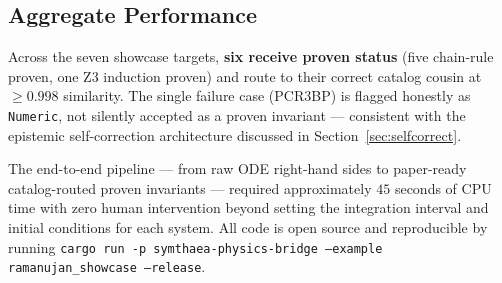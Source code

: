 \subsection{Aggregate Performance}

Across the seven showcase targets, \textbf{six receive proven status}
(five chain-rule proven, one Z3 induction proven) and route to their
correct catalog cousin at $\geq 0.998$ similarity. The single failure
case (PCR3BP) is flagged honestly as \texttt{Numeric}, not silently
accepted as a proven invariant --- consistent with the epistemic
self-correction architecture discussed in Section~\ref{sec:selfcorrect}.

The end-to-end pipeline --- from raw ODE right-hand sides to
paper-ready catalog-routed proven invariants --- required
approximately $45$ seconds of CPU time with zero human intervention
beyond setting the integration interval and initial conditions for
each system. All code is open source and reproducible by running
\texttt{cargo run -p symthaea-physics-bridge --example ramanujan\_showcase --release}.

